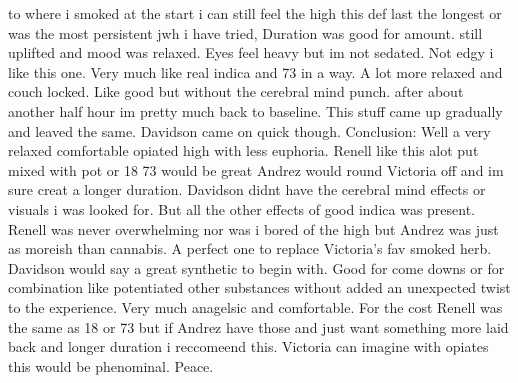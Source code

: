 \documentclass[12pt]{book}
\begin{document}
to where i smoked at the start i can still feel the high this def last the longest or was the most persistent jwh i have tried, Duration was good for amount. still uplifted and mood was relaxed. Eyes feel heavy but im not sedated. Not edgy i like this one. Very much like real indica and 73 in a way. A lot more relaxed and couch locked. Like good but without the cerebral mind punch. after about another half hour im pretty much back to baseline. This stuff came up gradually and leaved the same. Davidson came on quick though. Conclusion: Well a very relaxed comfortable opiated high with less euphoria. Renell like this alot put mixed with pot or 18 73 would be great Andrez would round Victoria off and im sure creat a longer duration. Davidson didnt have the cerebral mind effects or visuals i was looked for. But all the other effects of good indica was present. Renell was never overwhelming nor was i bored of the high but Andrez was just as moreish than cannabis. A perfect one to replace Victoria's fav smoked herb. Davidson would say a great synthetic to begin with. Good for come downs or for combination like potentiated other substances without added an unexpected twist to the experience. Very much anagelsic and comfortable. For the cost Renell was the same as 18 or 73 but if Andrez have those and just want something more laid back and longer duration i reccomeend this. Victoria can imagine with opiates this would be phenominal. Peace.
\end{document}
